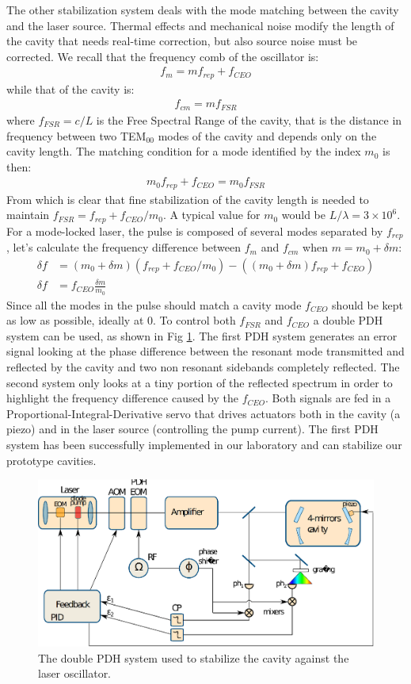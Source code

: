 The other stabilization system deals with the mode matching between the cavity and the laser source. Thermal effects and mechanical noise modify the length of the cavity that needs real-time correction, but also source noise must be corrected.
We recall that the frequency comb of the oscillator is:
\begin{align*}
f_m = m f_{rep} + f_{CEO}
\end{align*}
while that of the cavity is:
\begin{align}
f_{cm} = m f_{FSR}
\end{align}
where $f_{FSR} = c/L$ is the Free Spectral Range of the cavity, that is the distance in frequency between two TEM$_{00}$ modes of the cavity and depends only on the cavity length.
The matching condition for a mode identified by the index $m_0$ is then:
\begin{align}
m_0 f_{rep} + f_{CEO} = m_0 f_{FSR}
\end{align}
From which is clear that fine stabilization of the cavity length is needed to maintain $f_{FSR} = f_{rep} + f_{CEO}/m_0$. A typical value for $m_0$ would be $L/\lambda = 3\times10^6$.
For a mode-locked laser, the pulse is composed of several modes separated by $f_{rep}$, let's calculate the frequency difference between $f_m$ and $f_{cm}$ when $m=m_0+\delta m$:
\begin{align}
\delta f &= (m_0+\delta m)(f_{rep} + f_{CEO}/m_0) - ((m_0+\delta m) f_{rep} + f_{CEO})\\
\delta f &= f_{CEO}\frac{\delta m}{m_0}
\end{align}
Since all the modes in the pulse should match a cavity mode $f_{CEO}$ should be kept as low as possible, ideally at 0. To control both $f_{FSR}$ and $f_{CEO}$ a double PDH \parencite{Black2001} system can be used, as shown in Fig \ref{fig:PDH}. The first PDH system generates an error signal looking at the phase difference between the resonant mode transmitted and reflected by the cavity and two non resonant sidebands completely reflected. The second system only looks at a tiny portion of the reflected spectrum in order to highlight the frequency difference caused by the $f_{CEO}$. Both signals are fed in a Proportional-Integral-Derivative servo that drives actuators both in the cavity (a piezo) and in the laser source (controlling the pump current). The first PDH system has been successfully implemented in our laboratory and can stabilize our prototype cavities.
\begin{figure}
	\centering
	\includegraphics[width=0.9\linewidth]{images/PDH.eps}
	\caption{The double PDH system used to stabilize the cavity against the laser oscillator.}
	\label{fig:PDH}
\end{figure}